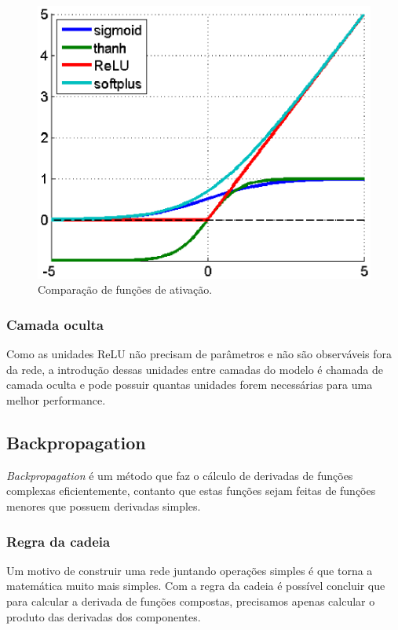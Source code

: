 \begin{figure}[H]
\centering
\includegraphics[scale=0.6]{imagens/activation_funcs.eps}
\caption{Comparação de funções de ativação.}
\label{fig:activation_funcs}
\end{figure}

\subsubsection{Camada oculta}

Como as unidades ReLU não precisam de parâmetros e não são observáveis
fora da rede, a introdução dessas unidades entre camadas do modelo é
chamada de camada oculta e pode possuir quantas unidades forem
necessárias para uma melhor performance.

\subsection{Backpropagation}

\textit{Backpropagation}\cite{Goodfellow-et-al-2016-Book} é um método
que faz o cálculo de derivadas de funções complexas eficientemente,
contanto que estas funções sejam feitas de funções menores que possuem
derivadas simples. 

\subsubsection{Regra da cadeia}

Um motivo de construir uma rede juntando operações simples é que torna
a matemática muito mais simples. Com a regra da cadeia é possível
concluir que para calcular a derivada de funções compostas, precisamos
apenas calcular o produto das derivadas dos componentes.

